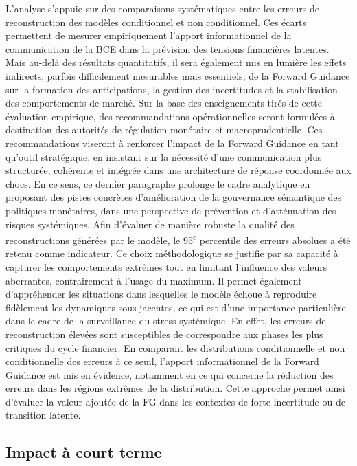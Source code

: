 L’analyse s’appuie sur des comparaisons systématiques entre les erreurs de reconstruction des modèles conditionnel et non conditionnel. Ces écarts permettent de mesurer empiriquement l’apport informationnel de la communication de la BCE dans la prévision des tensions financières latentes. Mais au-delà des résultats quantitatifs, il sera également mis en lumière les effets indirects, parfois difficilement mesurables mais essentiels, de la Forward Guidance sur la formation des anticipations, la gestion des incertitudes et la stabilisation des comportements de marché. Sur la base des enseignements tirés de cette évaluation empirique, des recommandations opérationnelles seront formulées à destination des autorités de régulation monétaire et macroprudentielle. Ces recommandations viseront à renforcer l’impact de la Forward Guidance en tant qu’outil stratégique, en insistant sur la nécessité d’une communication plus structurée, cohérente et intégrée dans une architecture de réponse coordonnée aux chocs. En ce sens, ce dernier paragraphe prolonge le cadre analytique en proposant des pistes concrètes d’amélioration de la gouvernance sémantique des politiques monétaires, dans une perspective de prévention et d’atténuation des risques systémiques. Afin d’évaluer de manière robuste la qualité des reconstructions générées par le modèle, le 95\textsuperscript{e} percentile des erreurs absolues a été retenu comme indicateur. Ce choix méthodologique se justifie par sa capacité à capturer les comportements extrêmes tout en limitant l’influence des valeurs aberrantes, contrairement à l’usage du maximum. Il permet également d’appréhender les situations dans lesquelles le modèle échoue à reproduire fidèlement les dynamiques sous-jacentes, ce qui est d'une importance particulière dans le cadre de la surveillance du stress systémique. En effet, les erreurs de reconstruction élevées sont susceptibles de correspondre aux phases les plus critiques du cycle financier. En comparant les distributions conditionnelle et non conditionnelle des erreurs à ce seuil, l’apport informationnel de la Forward Guidance est mis en évidence, notamment en ce qui concerne la réduction des erreurs dans les régions extrêmes de la distribution. Cette approche permet ainsi d’évaluer la valeur ajoutée de la FG dans les contextes de forte incertitude ou de transition latente.

\subsection{Impact à court terme}

